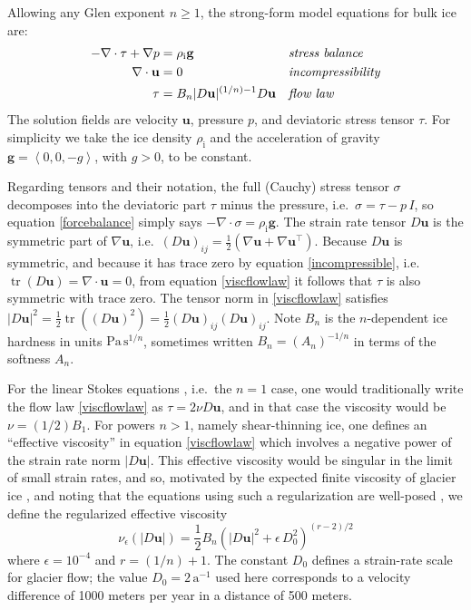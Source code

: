 \documentclass[letterpaper,final,12pt,reqno]{amsart}
\newcommand{\eps}{\epsilon}
\newcommand{\grad}{\nabla}
\newcommand{\Div}{\nabla\cdot}
\newcommand{\trace}{\operatorname{tr}}
\newcommand{\bg}{\mathbf{g}}
\newcommand{\bu}{\mathbf{u}}
\newcommand{\rhoi}{\rho_{\text{i}}}
\begin{document}
Allowing any Glen exponent $n\ge 1$, the strong-form model equations for bulk ice are:
\begin{align}
- \nabla \cdot \tau + \nabla p &= \rhoi \bg &&\text{\emph{stress balance}} \label{forcebalance} \\
\nabla \cdot \bu &= 0 &&\text{\emph{incompressibility}} \label{incompressible} \\
\tau &= B_n |D\bu|^{(1/n) - 1} D\bu  &&\text{\emph{flow law}} \label{viscflowlaw}
\end{align}
The solution fields are velocity $\bu$, pressure $p$, and deviatoric stress tensor $\tau$.  For simplicity we take the ice density $\rhoi$ and the acceleration of gravity $\bg=\left<0,0,-g\right>$, with $g>0$, to be constant.

Regarding tensors and their notation, the full (Cauchy) stress tensor $\sigma$ \cite{GreveBlatter2009} decomposes into the deviatoric part $\tau$ minus the pressure, i.e.~$\sigma = \tau - p\,I$, so equation \eqref{forcebalance} simply says $-\Div \sigma = \rhoi \bg$.  The strain rate tensor $D\bu$ is the symmetric part of $\grad \bu$, i.e.~$(D\bu)_{ij} = \frac{1}{2} \left(\grad\bu + \grad\bu^\top\right)$.  Because $D\bu$ is symmetric, and because it has trace zero by equation \eqref{incompressible}, i.e.~$\trace(D\bu)=\nabla \cdot \bu = 0$, from equation \eqref{viscflowlaw} it follows that $\tau$ is also symmetric with trace zero.  The tensor norm in \eqref{viscflowlaw} satisfies $|D\bu|^2 = \frac{1}{2} \trace\left((D\bu)^2\right) = \frac{1}{2} (D\bu)_{ij} (D\bu)_{ij}$.  Note $B_n$ is the $n$-dependent ice hardness in units $\text{Pa}\,\text{s}^{1/n}$, sometimes written $B_n = (A_n)^{-1/n}$ in terms of the softness $A_n$.

For the linear Stokes equations \cite{Elmanetal2014}, i.e.~the $n=1$ case, one would traditionally write the flow law \eqref{viscflowlaw} as $\tau = 2\nu D\bu$, and in that case the viscosity would be $\nu = (1/2) B_1$.  For powers $n>1$, namely shear-thinning ice, one defines an ``effective viscosity'' in equation \eqref{viscflowlaw} which involves a negative power of the strain rate norm $|D\bu|$.  This effective viscosity would be singular in the limit of small strain rates, and so, motivated by the expected finite viscosity of glacier ice \cite{GreveBlatter2009}, and noting that the equations using such a regularization are well-posed \cite{JouvetRappaz2011}, we define the regularized effective viscosity
\begin{equation}
\nu_\eps(|D\bu|) = \frac{1}{2} B_n \left(|D\bu|^2 + \eps\, D_0^2\right)^{(r-2)/2} \label{regeffvisc}
\end{equation}
where $\eps = 10^{-4}$ and $r=(1/n)+1$.  The constant $D_0$ defines a strain-rate scale for glacier flow; the value $D_0 = 2 \,\text{a}^{-1}$ used here corresponds to a velocity difference of 1000 meters per year in a distance of 500 meters.
\end{document}
